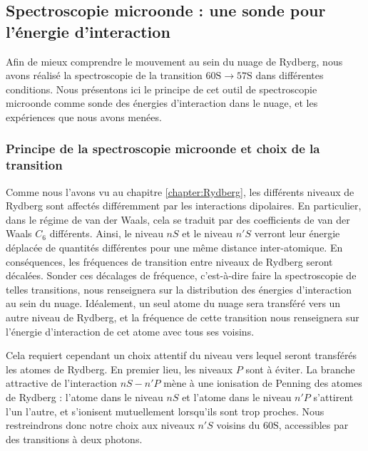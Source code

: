 	\subsection{Spectroscopie microonde : une sonde pour l'énergie d'interaction} \label{subsec:mw_spectro_exp}
\noindent Afin de mieux comprendre le mouvement au sein du nuage de Rydberg, nous avons réalisé la spectroscopie de la transition $\mathrm{60S} \rightarrow \mathrm{57S}$ dans différentes conditions.
Nous présentons ici le principe de cet outil de spectroscopie microonde comme sonde des énergies d'interaction dans le nuage, et les expériences que nous avons menées.

	\subsubsection*{Principe de la spectroscopie microonde et choix de la transition}
\noindent Comme nous l'avons vu au chapitre \ref{chapter:Rydberg}, les différents niveaux de Rydberg sont affectés différemment par les interactions dipolaires.
En particulier, dans le régime de van der Waals, cela se traduit par des coefficients de van der Waals $C_6$ différents.
Ainsi, le niveau $nS$ et le niveau $n'S$ verront leur énergie déplacée de quantités différentes pour une même distance inter-atomique.
En conséquences, les fréquences de transition entre niveaux de Rydberg seront décalées.
Sonder ces décalages de fréquence, c'est-à-dire faire la spectroscopie de telles transitions, nous renseignera sur la distribution des énergies d'interaction au sein du nuage.
Idéalement, un seul atome du nuage sera transféré vers un autre niveau de Rydberg, et la fréquence de cette transition nous renseignera sur l'énergie d'interaction de cet atome avec tous ses voisins.

Cela requiert cependant un choix attentif du niveau vers lequel seront transférés les atomes de Rydberg.
En premier lieu, les niveaux $P$ sont à éviter.
La branche attractive de l'interaction $nS - n'P$ mène à une ionisation de Penning des atomes de Rydberg : l'atome dans le niveau $nS$ et l'atome dans le niveau $n'P$ s'attirent l'un l'autre, et s'ionisent mutuellement lorsqu'ils sont trop proches.
Nous restreindrons donc notre choix aux niveaux $n'S$ voisins du $\mathrm{60S}$, accessibles par des transitions à deux photons.

